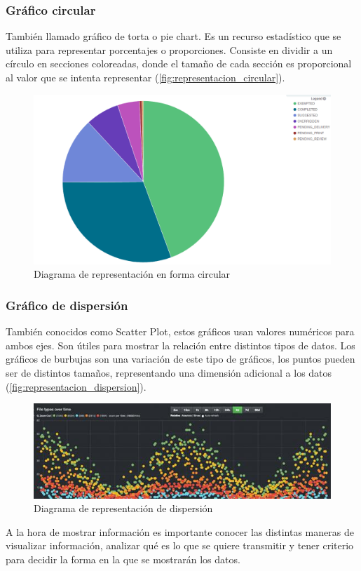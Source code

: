 \subsubsection*{Gráfico circular}
También llamado gráfico de torta o pie chart. Es un recurso estadístico que se
utiliza para representar porcentajes o proporciones. Consiste en dividir a un
círculo en secciones coloreadas, donde el tamaño de cada sección es
proporcional al valor que se intenta representar
(\autoref{fig:representacion_circular}).

\begin{figure}
  \includegraphics[width=\linewidth]{src/images/01-capitulo-1/representacion_circular.png}
  \caption{Diagrama de representación en forma circular}
  \label{fig:representacion_circular}
\end{figure}

\subsubsection*{Gráfico de dispersión}
También conocidos como Scatter Plot, estos gráficos usan valores numéricos para
ambos ejes. Son útiles para mostrar la relación entre distintos tipos de datos.
Los gráficos de burbujas son una variación de este tipo de gráficos, los puntos
pueden ser de distintos tamaños, representando una dimensión adicional a los
datos (\autoref{fig:representacion_dispersion}).

\begin{figure}
  \includegraphics[width=\linewidth]{src/images/01-capitulo-1/representacion_dispersion.jpg}
  \caption{Diagrama de representación de dispersión}
  \label{fig:representacion_dispersion}
\end{figure}

A la hora de mostrar información es importante conocer las distintas maneras de
visualizar información, analizar qué es lo que se quiere transmitir y tener
criterio para decidir la forma en la que se mostrarán los datos.

